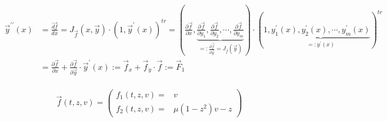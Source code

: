\begin{equation}
\begin{aligned}
\vec{y}^{\prime \prime}(x)&=\frac{\overrightarrow{d f}}{d x}=J_{\vec{f}}(x, \vec{y}) \cdot\left(1, \vec{y}^{\prime}(x)\right)^{t r}=(\frac{\partial \vec{f}}{\partial x}, \underbrace{\frac{\partial \vec{f}}{\partial y_1}, \frac{\partial \vec{f}}{\partial y_2}, \cdots, \frac{\partial \vec{f}}{\partial y_m}}_{=: \frac{\partial \vec{f}}{\partial \vec{y}}=J_{\bar{f}}(\vec{y})})\cdot (1, \underbrace{y_1^{\prime}(x), y_2^{\prime}(x), \cdots, y_m^{\prime}(x)}_{=: y^{\prime}(x)})^{t r}\\&=
 \frac{\partial \vec{f}}{\partial x}+\frac{\partial \vec{f}}{\partial \vec{y}} \cdot \vec{y}^{\prime}(x):=\vec{f}_x+\vec{f}_{\dot{y}} \cdot \vec{f}:=\vec{F}_1 \\
\end{aligned}
\end{equation}

 \begin{equation}
\vec{f}(t, z, v)=\left(\begin{array}{lc}
f_1(t, z, v)= & v \\
f_2(t, z, v)= & \mu\left(1-z^2\right) v-z
\end{array}\right)
\end{equation}

